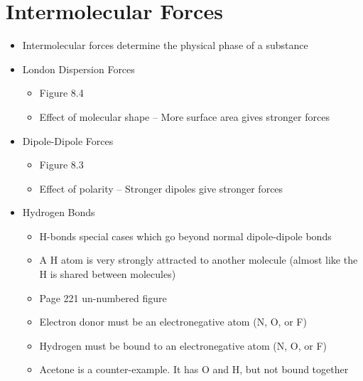 \documentclass[12pt, openany, letterpaper]{memoir}
\begin{document}
\section{Intermolecular Forces}
\begin{itemize}
	\item Intermolecular forces determine the physical phase of a substance
	\item London Dispersion Forces
	      \begin{itemize}
		      \item Figure 8.4
		      \item Effect of molecular shape -- More surface area gives stronger forces
	      \end{itemize}
	\item Dipole-Dipole Forces
	      \begin{itemize}
		      \item Figure 8.3
		      \item Effect of polarity -- Stronger dipoles give stronger forces
	      \end{itemize}
	\item Hydrogen Bonds
	      \begin{itemize}
		      \item H-bonds special cases which go beyond normal dipole-dipole bonds
		      \item A H atom is very strongly attracted to another molecule (almost like the H is shared between molecules)
		      \item Page 221 un-numbered figure
		      \item Electron donor must be an electronegative atom (N, O, or F)
		      \item Hydrogen must be bound to an electronegative atom (N, O, or F)
		      \item Acetone is a counter-example. It has O and H, but not bound together
	      \end{itemize}
\end{itemize}
\end{document}
